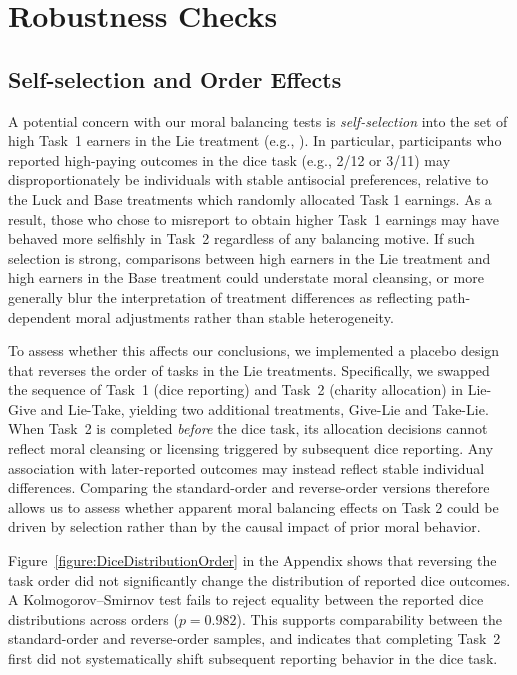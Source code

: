 \documentclass{article}
\begin{document}
\section{Robustness Checks} \label{robustness}

\subsection*{Self-selection and Order Effects} \label{selfselect}
A potential concern with our moral balancing tests is \textit{self-selection} into the set of high Task~1 earners in the Lie treatment (e.g., \cite{Ploner2013,BranasGarza2013}). In particular, participants who reported high-paying outcomes in the dice task (e.g., 2/12 or 3/11) may disproportionately be individuals with stable antisocial preferences, relative to the Luck and Base treatments which randomly allocated Task 1 earnings. As a result, those who chose to misreport to obtain higher Task~1 earnings may have behaved more selfishly in Task~2 regardless of any balancing motive. If such selection is strong, comparisons between high earners in the Lie treatment and high earners in the Base treatment could understate moral cleansing, or more generally blur the interpretation of treatment differences as reflecting path-dependent moral adjustments rather than stable heterogeneity.
\par
To assess whether this affects our conclusions, we implemented a placebo design that reverses the order of tasks in the Lie treatments. Specifically, we swapped the sequence of Task~1 (dice reporting) and Task~2 (charity allocation) in Lie-Give and Lie-Take, yielding two additional treatments, Give-Lie and Take-Lie. When Task~2 is completed \emph{before} the dice task, its allocation decisions cannot reflect moral cleansing or licensing triggered by subsequent dice reporting. Any association with later-reported outcomes may instead reflect stable individual differences. Comparing the standard-order and reverse-order versions therefore allows us to assess whether apparent moral balancing effects on Task 2 could be driven by selection rather than by the causal impact of prior moral behavior.
\par
Figure~\ref{figure:DiceDistributionOrder} in the Appendix shows that reversing the task order did not significantly change the distribution of reported dice outcomes. A Kolmogorov–Smirnov test fails to reject equality between the reported dice distributions across orders ($p=0.982$). This supports comparability between the standard-order and reverse-order samples, and indicates that completing Task~2 first did not systematically shift subsequent reporting behavior in the dice task.
\end{document}
